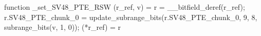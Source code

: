 function _set_SV48_PTE_RSW (r_ref, v) = {
    r = __bitfield_deref(r_ref);
    r.SV48_PTE_chunk_0 = update_subrange_bits(r.SV48_PTE_chunk_0, 9, 8, subrange_bits(v, 1, 0));
    (*r_ref) = r
}
